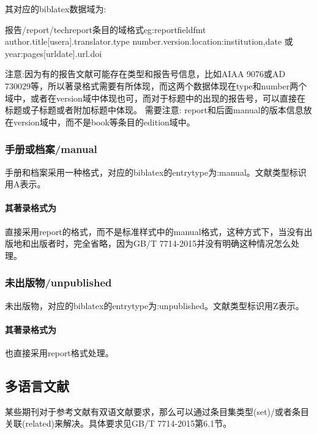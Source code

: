 其对应的biblatex数据域为:
\begin{codetex}{报告/report/techreport条目的域格式}{eg:reportfieldfmt}
author.title[usera].translator.type number.version.location:institution,date 或year:pages[urldate].url.doi
\end{codetex}

注意:因为有的报告文献可能存在类型和报告号信息，比如AIAA 9076或AD 730029等，所以著录格式需要有所体现，而这两个数据体现在type和number两个域中，或者在version域中体现也可，而对于标题中的出现的报告号，可以直接在标题或子标题或者附加标题中体现。
需要注意: report和后面manual的版本信息放在version域中，而不是book等条目的edition域中。

\subsubsection{手册或档案/manual}
\begin{refentry}{}{}
手册和档案采用一种格式，对应的biblatex的entrytype为:manual。文献类型标识用A表示。

\paragraph{其著录格式为} 直接采用report的格式，而不是标准样式中的manual格式，这种方式下，当没有出版地和出版者时，完全省略，因为GB/T 7714-2015并没有明确这种情况怎么处理。
\end{refentry}


\subsubsection{未出版物/unpublished}
\begin{refentry}{}{}
未出版物，对应的biblatex的entrytype为:unpublished。文献类型标识用Z表示。

\paragraph{其著录格式为} 也直接采用report格式处理。
\end{refentry}

\subsection{多语言文献}\label{sec:multilan:implement}

某些期刊对于参考文献有双语文献要求，那么可以通过条目集类型(set)/或者条目关联(related)来解决。具体要求见GB/T 7714-2015第6.1节。

